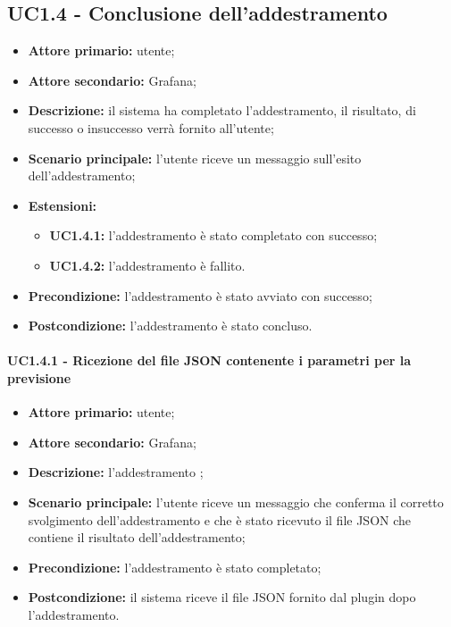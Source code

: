 \documentclass{article}
\begin{document}
	\subsection{UC1.4 - Conclusione dell'addestramento}
	\begin{itemize}
		\item \textbf{Attore primario:} utente;
		\item \textbf{Attore secondario:} Grafana;
		\item \textbf{Descrizione:} il sistema ha completato l'addestramento, il risultato, di successo o insuccesso verrà fornito all'utente;
		\item \textbf{Scenario principale:} l'utente riceve un messaggio sull'esito dell'addestramento;
		\item \textbf{Estensioni:}
			\begin{itemize}
				\item \textbf{UC1.4.1:} l'addestramento è stato completato con successo;
				\item \textbf{UC1.4.2:} l'addestramento è fallito.
			\end{itemize}
		\item \textbf{Precondizione:} l'addestramento è stato avviato con successo;
		\item \textbf{Postcondizione:} l'addestramento è stato concluso.
	\end{itemize}
	
	\paragraph{UC1.4.1 - Ricezione del file JSON contenente i parametri per la previsione}
	\begin{itemize}
		\item \textbf{Attore primario:} utente;
		\item \textbf{Attore secondario:} Grafana;
		\item \textbf{Descrizione:} l'addestramento ;
		\item \textbf{Scenario principale:} l'utente riceve un messaggio che conferma il corretto svolgimento dell'addestramento e che è stato ricevuto il file JSON che contiene il risultato dell'addestramento;
		\item \textbf{Precondizione:} l'addestramento è stato completato;
		\item \textbf{Postcondizione:} il sistema riceve il file JSON fornito dal plugin dopo l'addestramento.
	\end{itemize}
\end{document}
